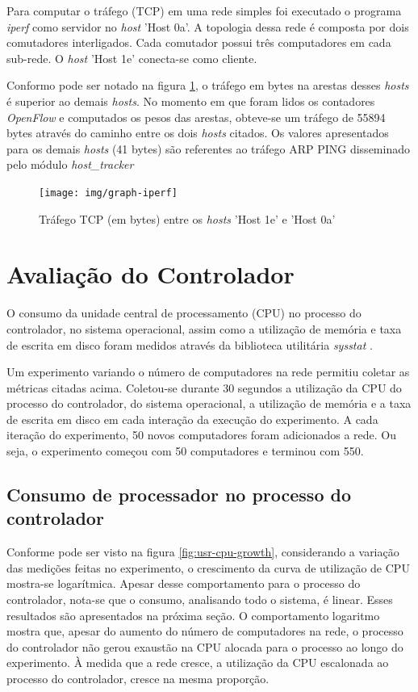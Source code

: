 Para computar o tráfego (TCP) em uma rede simples foi executado o programa
\emph{iperf} como servidor no \emph{host} 'Host 0a'.
A topologia dessa rede é composta por dois comutadores interligados.
Cada comutador possui três computadores em cada sub-rede.
O \emph{host} 'Host 1e' conecta-se como cliente.

Conformo pode ser notado na figura \ref{fig:iperf}, o tráfego
em bytes na arestas desses \emph{hosts} é superior ao demais \emph{hosts}.
No momento em que foram lidos os contadores \emph{OpenFlow} e computados
os pesos das arestas, obteve-se um tráfego de 55894 bytes através do caminho
entre os dois \emph{hosts} citados.
Os valores apresentados para os demais \emph{hosts} (41 bytes) são referentes
ao tráfego ARP PING disseminado pelo módulo \emph{host\_tracker}

\begin{figure}[h!]
    \centering
    \texttt{[image: img/graph-iperf]}
    \caption{Tráfego TCP (em bytes) entre os \emph{hosts} ’Host 1e’ e
    ’Host 0a’}
    \label{fig:iperf}
\end{figure}

\section{Avaliação do Controlador}

O consumo da unidade central de processamento (CPU) no processo do controlador,
no sistema operacional, assim como a utilização de memória e taxa de escrita
em disco foram medidos através da biblioteca utilitária \emph{sysstat}
\citep{sebastien2015sysstat}.

Um experimento variando o número de computadores na rede permitiu coletar
as métricas citadas acima.
Coletou-se durante 30 segundos a utilização da CPU do processo do controlador,
do sistema operacional, a utilização de memória e a taxa de escrita em disco
em cada interação da execução do experimento.
A cada iteração do experimento, 50 novos computadores foram adicionados a rede.
Ou seja, o experimento começou com 50 computadores e terminou com 550.

\subsection{Consumo de processador no processo do controlador}


Conforme pode ser visto na figura \ref{fig:usr-cpu-growth}, considerando a
variação das medições feitas no experimento, o crescimento da curva de
utilização de CPU mostra-se logarítmica.
Apesar desse comportamento para o processo do controlador, nota-se que o
consumo, analisando todo o sistema, é linear.
Esses resultados são apresentados na próxima seção.
O comportamento logaritmo mostra que, apesar do aumento do número de
computadores na rede, o processo do controlador não gerou exaustão na CPU
alocada para o processo ao longo do experimento.
À medida que a rede cresce, a utilização da CPU escalonada ao processo do
controlador, cresce na mesma proporção.

